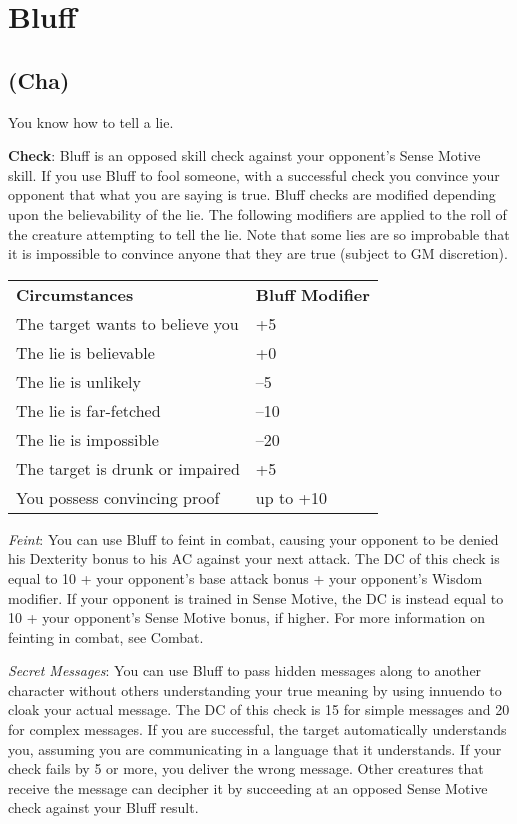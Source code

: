 \section{Bluff}

\label{f0}
\subsection{(Cha)}

				
You know how to tell a lie.
				
\textbf{Check}: Bluff is an opposed skill check against your opponent's Sense Motive skill. If you use Bluff to fool someone, with a successful check you convince your opponent that what you are saying is true. Bluff checks are modified depending upon the believability of the lie. The following modifiers are applied to the roll of the creature attempting to tell the lie. Note that some lies are so improbable that it is impossible to convince anyone that they are true (subject to GM discretion).

\begin{table}
 \sffamily
 \begin{tabular}{ll}
  \textbf{Circumstances} & \textbf{Bluff Modifier} \\
The target wants to believe you & +5 \\
The lie is believable & +0\\
The lie is unlikely & --5\\
The lie is far-fetched & --10 \\
The lie is impossible & --20\\
The target is drunk or impaired & +5 \\
You possess convincing proof & up to +10 \\
 \end{tabular}
\end{table}

				
\textit{Feint}: You can use Bluff to feint in combat, causing your opponent to be denied his Dexterity bonus to his AC against your next attack. The DC of this check is equal to 10 + your opponent's base attack bonus + your opponent's Wisdom modifier. If your opponent is trained in Sense Motive, the DC is instead equal to 10 + your opponent's Sense Motive bonus, if higher. For more information on feinting in combat, see Combat.
				
\textit{Secret Messages}: You can use Bluff to pass hidden messages along to another character without others understanding your true meaning by using innuendo to cloak your actual message. The DC of this check is 15 for simple messages and 20 for complex messages. If you are successful, the target automatically understands you, assuming you are communicating in a language that it understands. If your check fails by 5 or more, you deliver the wrong message. Other creatures that receive the message can decipher it by succeeding at an opposed Sense Motive check against your Bluff result. 
				
